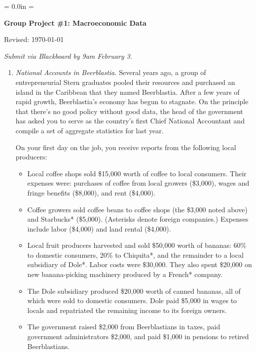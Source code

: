 \documentclass[letterpaper,12pt]{article}
\def\HeadName{Group Project \#1}
\begin{document}
\parindent = 0.0in
\parskip = \bigskipamount
\thispagestyle{empty}%
\Head

\centerline{\large \bf \HeadName: Macroeconomic Data} 
\centerline{Revised:  \today}

\medskip
{\it Submit via Blackboard by 9am February 3.}

\begin{enumerate}
\item {\it National Accounts in Beerblastia.} 
Several years ago,
a group of entrepreneurial Stern graduates pooled their resources and
purchased an island in the Caribbean that they named Beerblastia.
After a few years of rapid growth, Beerblastia's economy has begun
to stagnate.  On the principle that there's no good policy without
good data, the head of the government has asked you to serve as
the country's first Chief National Accountant and compile a
set of aggregate statistics for last year.

On your first day on the job, you receive reports 
from the following local producers:  
%
\begin{itemize}
\item Local coffee shops sold \$15,000 worth of coffee to
local consumers. 
Their expenses were:  
purchases of coffee from local growers (\$3,000), 
wages and fringe benefits (\$8,000), 
and rent (\$4,000).

\item Coffee growers sold coffee beans to 
coffee shops (the \$3,000 noted above) and Starbucks* (\$5,000).
(Asterisks denote foreign companies.) 
Expenses include labor (\$4,000) and land rental (\$4,000).

\item Local fruit producers harvested and sold 
\$50,000 worth of bananas: 
60\% to domestic consumers, 20\% to Chiquita*, 
and the remainder to a local subsidiary of Dole*. 
Labor costs were \$30,000.  
They also spent \$20,000 on new banana-picking machinery
produced by a French* company.  

\item The Dole subsidiary produced \$20,000
worth of canned bananas, all of which were sold to domestic
consumers. Dole paid \$5,000 in wages to locals and repatriated
the remaining income to its foreign owners.  

\item The government raised \$2,000 from Beerblastians in taxes, 
paid government administrators \$2,000, 
and paid \$1,000 in pensions to retired Beerblastians.  


\end{itemize}
\end{enumerate}
\end{document}
